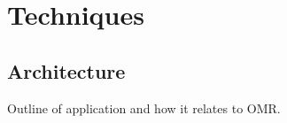 \chapter{Techniques}
\label{sec:techniques}

\section{Architecture}

Outline of application and how it relates to OMR.




\clearpage
